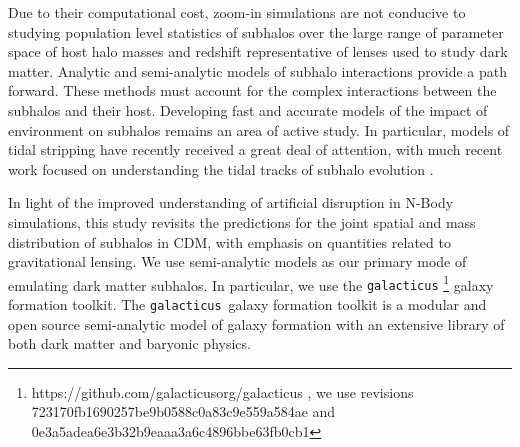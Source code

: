 \documentclass[%
 reprint,
 amsmath,
 amssymb,
 aps,
prd,
twocolumn,
superscriptaddress,
preprintnumbers,
floatfix,
nofootinbib
]{revtex4-2}
\def\gal{{\tt galacticus}~}
\def\galns{{\tt galacticus}}
\begin{document}
Due to their computational cost, zoom-in simulations are not conducive to studying population level statistics of subhalos over the large range of parameter space of host halo masses and redshift representative of lenses used to study dark matter.
Analytic and semi-analytic models of subhalo interactions provide a path forward.
These methods must account for the complex interactions between the subhalos and their host. %
Developing fast and accurate models of the impact of environment on subhalos remains an area of active study.
In particular, models of tidal stripping have recently received a great deal of attention, with much recent work focused on understanding the tidal tracks of subhalo evolution \citep{2020MNRAS.491.4591E, errani2021asymptotic,2022MNRAS.517.1398B,2024arXiv240309597D}.

In light of the improved understanding of artificial disruption in N-Body simulations, this study revisits the predictions for the joint spatial and mass distribution of subhalos in CDM, with emphasis on quantities related to gravitational lensing.
We use semi-analytic models as our primary mode of emulating dark matter subhalos.
In particular, we use the \galns
\footnote{https://github.com/galacticusorg/galacticus , we use revisions 723170fb1690257be9b0588c0a83c9e559a584ae and 0e3a5adea6e3b32b9eaaa3a6c4896bbe63fb0cb1 }
\citep{BENSON2012175} galaxy formation toolkit.
The \gal galaxy formation toolkit is a modular and open source semi-analytic model of galaxy formation with an extensive library of both dark matter and baryonic physics.%
\end{document}
